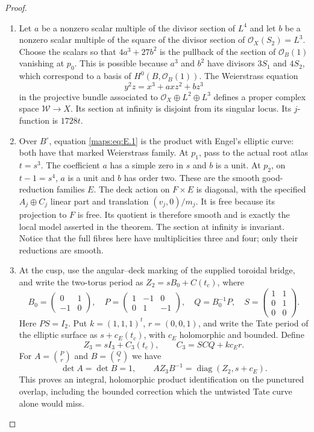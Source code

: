 \begin{proof}
\begin{enumerate}[label=\arabic*.,leftmargin=*]
\item Let $a$ be a nonzero scalar multiple of the divisor section of $L^4$
and let $b$ be a nonzero scalar multiple of the square of the divisor
section of $\mathcal O_X(S_2)=L^3$.  Choose the scalars so that
$4a^3+27b^2$ is the pullback of the section of $\mathcal O_B(1)$
vanishing at $p_0$.  This is possible because $a^3$ and $b^2$ have
divisors $3S_1$ and $4S_2$, which correspond to a basis of
$H^0(B,\mathcal O_B(1))$.  The Weierstrass equation
\[
 y^2z=x^3+axz^2+bz^3
 \tag{E.1}\label{maps:eq:E.1}
\]
in the projective bundle associated to
$\mathcal O_X\oplus L^2\oplus L^3$ defines a proper complex space
$\mathscr W\to X$.  Its section at infinity is disjoint from its
singular locus.  Its $j$-function is $1728t$.

\item Over $B^\circ$, equation \eqref{maps:eq:E.1} is the product with Engel's elliptic
curve: both have that marked Weierstrass family.  At $p_1$, pass to the
actual root atlas $t=s^3$.  The coefficient $a$ has a simple zero in $s$
and $b$ is a unit.  At $p_2$, on $t-1=s^4$, $a$ is a unit and $b$ has
order two.  These are the smooth good-reduction families $E$.
The deck action on $F\times E$ is diagonal, with the specified
$A_j\oplus C_j$ linear part and translation $(v_j,0)/m_j$.
It is free because its projection to $F$ is free.  Its quotient is
therefore smooth and is exactly the local model asserted in the theorem.
The section at infinity is invariant.  Notice that the full fibres here
have multiplicities three and four; only their reductions are smooth.

\item At the cusp, use the angular--deck marking of the supplied toroidal
bridge, and write the two-torus period as
$Z_2=sB_0+C(t_c)$, where
\[
 B_0=\begin{pmatrix}0&1\\-1&0\end{pmatrix},\quad
 P=\begin{pmatrix}1&-1&0\\0&1&-1\end{pmatrix},\quad
 Q=B_0^{-1}P,\quad
 S=\begin{pmatrix}1&1\\0&1\\0&0\end{pmatrix}.
\]
Here $PS=I_2$.  Put $k=(1,1,1)^t$, $r=(0,0,1)$, and write the Tate
period of the elliptic surface as $s+c_E(t_c)$, with $c_E$ holomorphic
and bounded.  Define
\[
 Z_3=sI_3+C_3(t_c),\qquad
 C_3=SCQ+kc_Er.
 \tag{E.2}\label{maps:eq:E.2}
\]
For $A=\binom{P}{r}$ and $B=\binom{Q}{r}$ we have
\[
 \det A=\det B=1,\qquad
 AZ_3B^{-1}=\operatorname{diag}(Z_2,s+c_E).
 \tag{E.3}\label{maps:eq:E.3}
\]
This proves an integral, holomorphic product identification on the
punctured overlap, including the bounded correction which the untwisted
Tate curve alone would miss.


\end{enumerate}
\end{proof}
